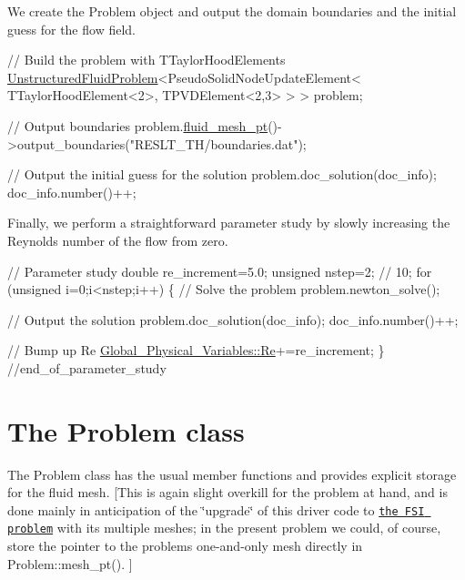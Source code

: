 We create the {\ttfamily Problem} object and output the domain boundaries and the initial guess for the flow field. 
\begin{DoxyCodeInclude}
  \textcolor{comment}{// Build the problem with TTaylorHoodElements}
  \hyperlink{classUnstructuredFluidProblem}{UnstructuredFluidProblem}<PseudoSolidNodeUpdateElement<
   TTaylorHoodElement<2>, 
   TPVDElement<2,3> > > problem;
  
  \textcolor{comment}{// Output boundaries }
  problem.\hyperlink{classUnstructuredFluidProblem_abc5f7e9929eb6f174eaa49a491489ad9}{fluid\_mesh\_pt}()->output\_boundaries(\textcolor{stringliteral}{"RESLT\_TH/boundaries.dat"});
  
  \textcolor{comment}{// Output the initial guess for the solution}
  problem.doc\_solution(doc\_info);
  doc\_info.number()++;

\end{DoxyCodeInclude}


Finally, we perform a straightforward parameter study by slowly increasing the Reynolds number of the flow from zero.


\begin{DoxyCodeInclude}
  
  \textcolor{comment}{// Parameter study}
  \textcolor{keywordtype}{double} re\_increment=5.0;
  \textcolor{keywordtype}{unsigned} nstep=2; \textcolor{comment}{// 10;}
  \textcolor{keywordflow}{for} (\textcolor{keywordtype}{unsigned} i=0;i<nstep;i++)
   \{
    \textcolor{comment}{// Solve the problem}
    problem.newton\_solve();
    
    \textcolor{comment}{// Output the solution}
    problem.doc\_solution(doc\_info);
    doc\_info.number()++;
    
    \textcolor{comment}{// Bump up Re}
    \hyperlink{namespaceGlobal__Physical__Variables_ab814e627d2eb5bc50318879d19ab16b9}{Global\_Physical\_Variables::Re}+=re\_increment;
   \}  \textcolor{comment}{//end\_of\_parameter\_study}

\end{DoxyCodeInclude}




 

\hypertarget{index_class}{}\section{The Problem class}\label{index_class}
The {\ttfamily Problem} class has the usual member functions and provides explicit storage for the fluid mesh. \mbox{[}This is again slight overkill for the problem at hand, and is done mainly in anticipation of the \char`\"{}upgrade\char`\"{} of this driver code to \href{../../../interaction/unstructured_fsi/html/index.html}{\tt the F\+SI problem} with its multiple meshes; in the present problem we could, of course, store the pointer to the problem\textquotesingle{}s one-\/and-\/only mesh directly in {\ttfamily Problem\+::mesh\+\_\+pt()}. \mbox{]}

